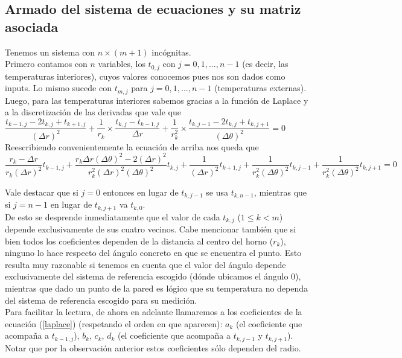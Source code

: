   
\subsection{Armado del sistema de ecuaciones y su matriz asociada}
Tenemos un sistema con $n\times(m+1)$ incógnitas.\\
Primero contamos con $n$ variables, los $t_{0,j}$ con $j = 0,1,\hdots, n-1$ (es decir, las temperaturas interiores), cuyos valores conocemos pues nos son dados como inputs. Lo mismo sucede con $t_{m, j}$ para $j = 0,1,..., n-1$ (temperaturas externas).
Luego, para las temperaturas interiores sabemos gracias a la función de Laplace y a la discretización de las derivadas que vale que \\

$\dfrac{t_{k-1,j} - 2t_{k,j} + t_{k+1,j}}{(\Delta r)^2} 
+ \dfrac{1}{r_k} \times \dfrac{t_{k,j} - t_{k-1,j}}{\Delta r}
+ \dfrac{1}{r_{k}^2} \times \dfrac{t_{k,j-1} -2t_{k,j} + t_{k,j+1}}{(\Delta \theta)^2} = 0$\\

Reescribiendo convenientemente la ecuación de arriba nos queda que \\

\begin{equation}
\label{laplace}
\dfrac{r_k - \Delta r}{r_k (\Delta r)^2} t_{k-1, j} +
\dfrac{r_k \Delta r (\Delta \theta)^2 - 2(\Delta r)^2}{r_k^2 (\Delta r)^2 (\Delta \theta)^2} t_{k,j} +
\dfrac{1}{(\Delta r)^2} t_{k+1,j} +
\dfrac{1}{r_k^2(\Delta \theta)^2} t_{k, j-1} +
\dfrac{1}{r_k^2(\Delta \theta)^2} t_{k, j+1} = 0
\end{equation}

Vale destacar que si $j = 0$ entonces en lugar de $t_{k, j-1}$ se usa $t_{k, n-1}$, mientras que si $j = n-1$ en lugar de $t_{k, j+1}$ va $t_{k, 0}$.\\
De esto se desprende inmediatamente que el valor de cada $t_{k,j}$ ($1\leq k < m$) depende exclusivamente de sus cuatro vecinos. Cabe mencionar también que si bien todos los coeficientes dependen de la distancia al centro del horno ($r_k$), ninguno lo hace respecto del ángulo concreto en que se encuentra el punto. Esto resulta muy razonable si tenemos en cuenta que el valor del ángulo depende exclusivamente del sistema de referencia escogido (dónde ubicamos el ángulo 0), mientras que dado un punto de la pared es lógico que su temperatura no dependa del sistema de referencia escogido para su medición.\\ 
Para facilitar la lectura, de ahora en adelante llamaremos a los coeficientes de la ecuación (\ref{laplace}) (respetando el orden en que aparecen): $a_k$ (el coeficiente que acompaña a $t_{k-1, j}$), $b_k$, $c_k$, $d_k$ (el coeficiente que acompaña a $t_{k, j-1}$ y $t_{k, j+1}$). Notar que por la observación anterior estos coeficientes sólo dependen del radio.



